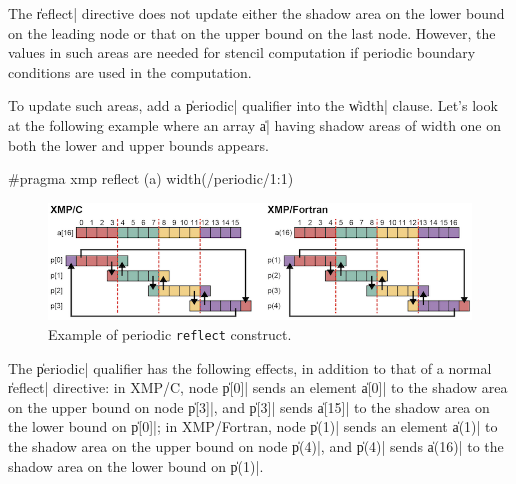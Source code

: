 

The \|reflect| directive does not update either the shadow area on the
lower bound on the leading node or that on the upper bound on the last
node. However, the values in such areas are needed for stencil
computation if periodic boundary conditions are used in the computation.

To update such areas, add a \|periodic| qualifier into the \|width|
clause. Let’s look at the following example where an array \|a| having
shadow areas of width one on both the lower and upper bounds appears.

\begin{XCexample}
#pragma xmp reflect (a) width(/periodic/1:1)
\end{XCexample}


\begin{figure}
  \centering
  \includegraphics[width=\textwidth]{figs/reflect_periodic.png}
  \caption{Example of periodic {\tt reflect} construct.}
\end{figure}

The \|periodic| qualifier has the following effects, in addition to that of
a normal \|reflect| directive: in XMP/C, node \|p[0]| sends an element
\|a[0]| to the shadow area on the upper bound on node \|p[3]|, and
\|p[3]| sends \|a[15]| to the shadow area on the lower bound on \|p[0]|;
in XMP/Fortran, node \|p(1)| sends an element \|a(1)| to the shadow area
on the upper bound on node \|p(4)|, and \|p(4)| sends \|a(16)| to the
shadow area on the lower bound on \|p(1)|.

